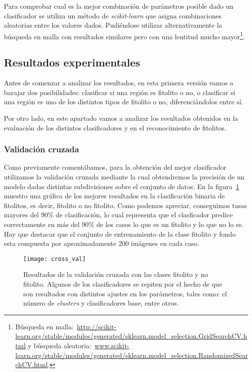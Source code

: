 Para comprobar cual es la mejor combinación de parámetros posible dado un clasificador se utiliza un método de \textit{scikit-learn} que asigna combinaciones aleatorias entre los valores dados. Pudiéndose utilizar alternativamente la búsqueda en malla con resultados similares pero con una lentitud mucho mayor\footnote{Búsqueda en malla:~\url{http://scikit-learn.org/stable/modules/generated/sklearn.model_selection.GridSearchCV.html} y búsqueda aleatoria:~\url{www.scikit-learn.org/stable/modules/generated/sklearn.model_selection.RandomizedSearchCV.html}.}.

\subsection{Resultados experimentales}

Antes de comenzar a analizar los resultados, en esta primera versión vamos a barajar dos posibilidades: clasificar si una región es fitolito o no, o clasificar si una región es uno de los distintos tipos de fitolito o no, diferenciándolos entre sí. 

Por otro lado, en este apartado vamos a analizar los resultados obtenidos en la evaluación de los distintos clasificadores y en el reconocimiento de fitolitos.

\subsubsection{Validación cruzada}

Como previamente comentábamos, para la obtención del mejor clasificador utilizamos la validación cruzada mediante la cual obtendremos la precisión de un modelo dadas distintas subdivisiones sobre el conjunto de datos. En la figura~\ref{fig:cross_val} muestro una gráfica de los mejores resultados en la clasificación binaria de fitolitos, es decir, fitolito o no fitolito. Como podemos apreciar, conseguimos tasas mayores del 90\% de clasificación, lo cual representa que el clasficador predice correctamente en más del 90\% de los casos lo que es un fitolito y lo que no lo es. Hay que destacar que el conjunto de entrenamiento de la clase fitolito y fondo esta compuesta por aproximadamente 200 imágenes en cada caso. 

\begin{figure}
\centering
\texttt{[image: cross\_val]}
\caption[Resultados de la validación cruzada con las clases fitolito y no fitolito]{Resultados de la validación cruzada con las clases fitolito y no fitolito. Algunos de los clasificadores se repiten por el hecho de que son resultados con distintos ajustes en los parámetros, tales como: el número de \textit{clusters} y clasificadores base, entre otros.}
\label{fig:cross_val}
\end{figure}

